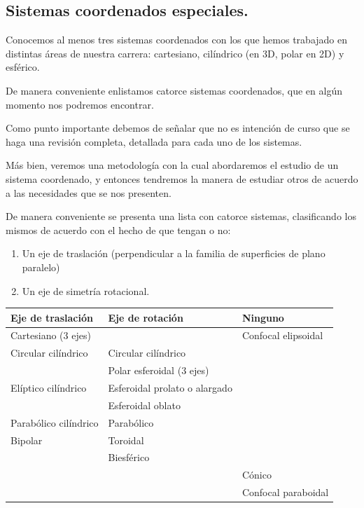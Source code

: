\subsection{Sistemas coordenados especiales.}
Conocemos al menos tres sistemas coordenados con los que hemos trabajado en distintas áreas de nuestra carrera: cartesiano, cilíndrico (en 3D, polar en 2D) y esférico.
\par
De manera conveniente enlistamos catorce sistemas coordenados, que en algún momento nos podremos encontrar.
\par
Como punto importante debemos de señalar que no es intención de curso que se haga una revisión completa, detallada para cada uno de los sistemas.
\par
Más bien, veremos una metodología con la cual abordaremos el estudio de un sistema coordenado, y entonces tendremos la manera de estudiar otros de acuerdo a las necesidades que se nos presenten.
\par
De manera conveniente se presenta una lista con catorce sistemas, clasificando los mismos de acuerdo con el hecho de que tengan o no:
\begin{enumerate}
\item Un eje de traslación (perpendicular a la familia de superficies de plano paralelo)
\item Un eje de simetría rotacional.
\end{enumerate}
{\fontsize{8}{8}\selectfont
\renewcommand{\arraystretch}{1.2}
\begin{table}[H]
\centering
\begin{tabular}{p{4cm} p{5.5cm} p{4cm}}
Eje de traslación & Eje de rotación & Ninguno \\ \hline
Cartesiano ($3$ ejes) & & Confocal elipsoidal \\
Circular cilíndrico & Circular cilíndrico & \\
& Polar esferoidal ($3$ ejes) & \\
Elíptico cilíndrico & Esferoidal prolato o alargado & \\
& Esferoidal oblato & \\
Parabólico cilíndrico & Parabólico & \\
Bipolar & Toroidal & \\
& Biesférico & \\[0.5em]
& & Cónico \\
& & Confocal paraboidal \\
\end{tabular}
\end{table}
}
